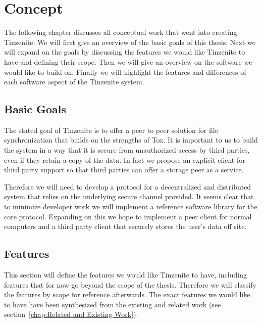 \chapter{Concept}
\label{chap:concept}

The following chapter discusses all conceptual work that went into creating Tinzenite.
We will first give an overview of the basic goals of this thesis.
Next we will expand on the goals by discussing the features we would like Tinzenite to have and defining their scope.
Then we will give an overview on the software we would like to build on.
Finally we will highlight the features and differences of each software aspect of the Tinzenite system.

\section{Basic Goals}
\label{sec:Basic Goals}

The stated goal of Tinzenite is to offer a peer to peer solution for file synchronization that builds on the strengths of Tox.
It is important to us to build the system in a way that it is secure from unauthorized access by third parties, even if they retain a copy of the data.
In fact we propose an explicit client for third party support so that third parties can offer a storage peer as a service.

Therefore we will need to develop a protocol for a decentralized and distributed system that relies on the underlying secure channel provided.
It seems clear that to minimize developer work we will implement a reference software library for the core protocol.
Expanding on this we hope to implement a peer client for normal computers and a third party client that securely stores the user's data off site.

\section{Features}
\label{sec:Features}

This section will define the features we would like Tinzenite to have, including features that for now go beyond the scope of the thesis.
Therefore we will classify the features by scope for reference afterwards.
The exact features we would like to have have been synthesized from the existing and related work (see section~\ref{chap:Related and Existing Work}).

